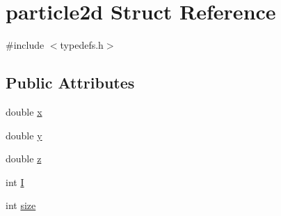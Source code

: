 \hypertarget{structparticle2d}{\section{particle2d Struct Reference}
\label{db/da4/structparticle2d}
}


{\ttfamily \#include $<$typedefs.\-h$>$}

\subsection*{Public Attributes}
\begin{DoxyCompactItemize}
\item 
double \hyperlink{structparticle2d_a284e37207b47400f6a47010f5e141b02}{x}
\item 
double \hyperlink{structparticle2d_a20ba47dec5ad0b909811d4848c9340a5}{y}
\item 
double \hyperlink{structparticle2d_ad282947b9a81b636c508f132ea1c3ea0}{z}
\item 
int \hyperlink{structparticle2d_a6e0771b5312a5ef4a159637bf59d34e1}{I}
\item 
int \hyperlink{structparticle2d_abc90f84ed6bf498d7317e8e8ca83a8b8}{size}
\end{DoxyCompactItemize}


